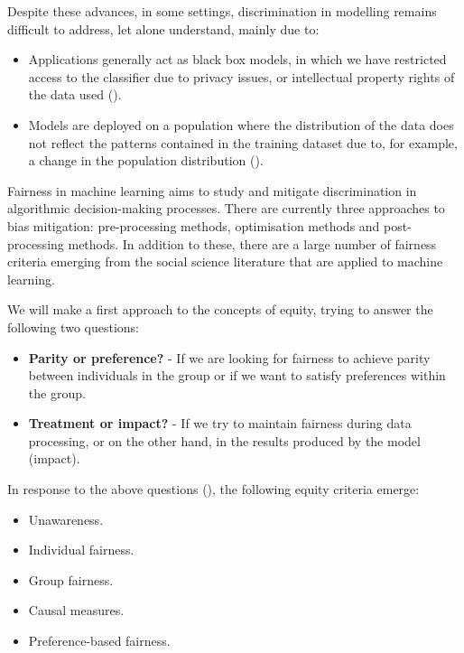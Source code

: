 \clearpage

Despite these advances, in some settings, discrimination in modelling remains difficult to address, let alone understand, mainly due to: 

\begin{itemize}
    \item Applications generally act as black box models, in which we have restricted access to the classifier due to privacy issues, or intellectual property rights of the data used (\cite{blackbox2014}).
	\item Models are deployed on a population where the distribution of the data does not reflect the patterns contained in the training dataset due to, for example, a change in the population distribution (\cite{distributionmodel2017}).
\end{itemize}

Fairness in machine learning aims to study and mitigate discrimination in algorithmic decision-making processes. There are currently three approaches to bias mitigation: pre-processing methods, optimisation methods and post-processing methods. In addition to these, there are a large number of fairness criteria emerging from the social science literature that are applied to machine learning. 

We will make a first approach to the concepts of equity, trying to answer the following two questions:

\begin{itemize}
    \item \textbf{Parity or preference?} - If we are looking for fairness to achieve parity between individuals in the group or if we want to satisfy preferences within the group.
    \item \textbf{Treatment or impact?} - If we try to maintain fairness during data processing, or on the other hand, in the results produced by the model (impact).
\end{itemize}

In response to the above questions (\cite{formalizing2018}), the following equity criteria emerge:

\begin{itemize}
    \item Unawareness.
    \item Individual fairness.
    \item Group fairness.
    \item Causal measures.
    \item Preference-based fairness.
\end{itemize}

